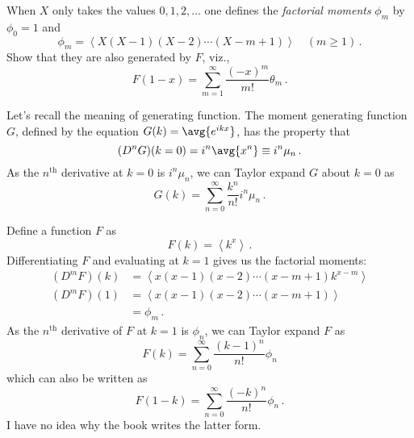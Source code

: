 

When $X$ only takes the values $0, 1, 2,\ldots$ one defines the \emph{factorial moments} $\phi_m$ by $\phi_0 = 1$ and
\begin{equation*}
\phi_m = \left \langle X (X-1) (X-2) \cdots (X-m+1) \right\rangle \quad (m \geq 1) \, .
\end{equation*}
Show that they are also generated by $F$, viz.,
\begin{equation*}
F(1 - x) = \sum_{m=1}^\infty \frac{(-x)^m}{m!} \theta_m \, .
\end{equation*}


Let's recall the meaning of generating function.
The moment generating function $G$, defined by the equation $G(k) = \avg{e^{ikx}}$, has the property that
\begin{equation*}
(D^nG)(k=0) = i^n \avg{x^n} \equiv i^n \mu_n \, .
\end{equation*}
As the $n^\text{th}$ derivative at $k=0$ is $i^n \mu_n$, we can Taylor expand $G$ about $k=0$ as
\begin{equation*}
G(k) = \sum_{n=0}^\infty \frac{k^n}{n!} i^n \mu_n \, .
\end{equation*}


Define a function $F$ as
\begin{equation*}
F(k) = \left \langle k^x \right \rangle \, .
\end{equation*}
Differentiating $F$ and evaluating at $k=1$ gives us the factorial moments:
\begin{align*}
(D^m F)(k)
&= \left\langle x(x-1)(x-2)\cdots(x-m+1) k^{x-m}\right\rangle \\
(D^m F)(1)
&= \left\langle x(x-1)(x-2)\cdots(x-m+1)\right\rangle \\
&= \phi_m \, .
\end{align*}
As the $n^\text{th}$ derivative of $F$ at $k=1$ is $\phi_n$, we can Taylor expand $F$ as
\begin{equation*}
F(k) = \sum_{n=0}^\infty \frac{(k-1)^n}{n!} \phi_n
\end{equation*}
which can also be written as
\begin{equation*}
F(1-k) = \sum_{n=0}^\infty \frac{(-k)^n}{n!} \phi_n \, .
\end{equation*}
I have no idea why the book writes the latter form.
